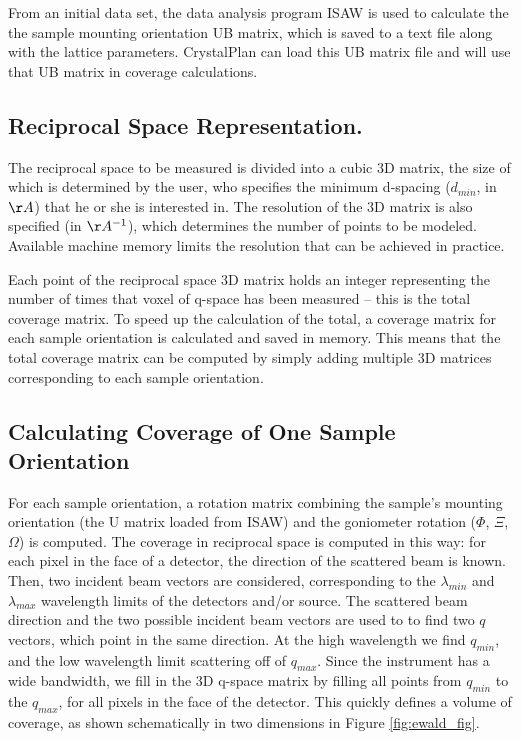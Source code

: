 \documentclass[final]{iucr}              %
\begin{document}
From an initial data set, the data analysis program ISAW \cite{Tao2006} is used
to calculate the the sample mounting orientation UB matrix, which is saved to a text file along with the lattice
parameters. CrystalPlan can load this UB matrix file and will use that UB matrix
in coverage calculations.
   
  
\subsection{Reciprocal Space Representation.}

The reciprocal space to be measured is divided into a cubic 3D matrix, the size
of which is determined by the user, who specifies the minimum d-spacing
($d_{min}$, in $\AA$) that he or she is interested in. The resolution of the 3D
matrix is also specified (in $\AA^{-1}$), which determines the number of points to be
modeled. Available machine memory limits the resolution that can be achieved in
practice.

Each point of the reciprocal space 3D matrix holds an integer representing the 
number of times that voxel of q-space has been measured – this is the total
coverage matrix. To speed up the calculation of the total, a coverage matrix for
each sample orientation is calculated and saved in memory. This means that the
total coverage matrix can be computed by simply adding multiple 3D matrices
corresponding to each sample orientation. 
 
\subsection{Calculating Coverage of One Sample Orientation}

For each sample orientation, a rotation matrix combining the sample's mounting
orientation (the U matrix loaded from ISAW) and the goniometer rotation
($\Phi$, $\Xi$, $\Omega$) is computed. The coverage in reciprocal space is
computed in this way: for each pixel in the face of a detector, the direction of
the scattered beam is known. Then, two incident beam vectors are considered,
corresponding to the $\lambda_{min}$ and $\lambda_{max}$ wavelength limits
of the detectors and/or source. The scattered beam direction and the two possible incident beam vectors
are used to to find two $q$ vectors, which point in the same direction. At the
high wavelength we find $q_{min}$, and the low wavelength limit scattering off
of $q_{max}$. Since the instrument has a wide bandwidth, we fill in the 3D q-space
matrix by filling all points from $q_{min}$ to the $q_{max}$, for all pixels in
the face of the detector. This quickly defines a volume of coverage, as shown
schematically in two dimensions in Figure \ref{fig:ewald_fig}.
\end{document}

